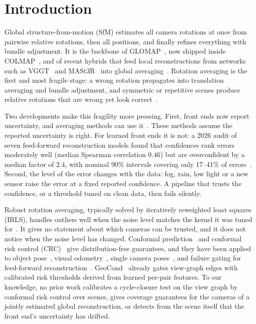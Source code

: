 \section{Introduction}\label{sec:intro}

Global structure-from-motion (SfM) estimates all camera rotations at once from pairwise relative rotations, then all positions, and finally refines everything with bundle adjustment. It is the backbone of GLOMAP~\cite{pan2024glomap}, now shipped inside COLMAP~\cite{schoenberger2016sfm}, and of recent hybrids that feed local reconstructions from networks such as VGGT~\cite{wang2025vggt} and MASt3R~\cite{leroy2024mast3r,duisterhof2025mast3rsfm} into global averaging~\cite{pan2026gluemap}. Rotation averaging is the first and most fragile stage: a wrong rotation propagates into translation averaging and bundle adjustment, and symmetric or repetitive scenes produce relative rotations that are wrong yet look correct~\cite{zach2010disambiguating,heinly2014correcting,cai2023doppelgangers}.

Two developments make this fragility more pressing. First, front ends now report uncertainty, and averaging methods can use it~\cite{zhang2023revisiting,olsson2025certifiably}. These methods assume the reported uncertainty is right. For learned front ends it is not: a 2026 audit of seven feed-forward reconstruction models found that confidences rank errors moderately well (median Spearman correlation $0.46$) but are overconfident by a median factor of $2.4$, with nominal 90\% intervals covering only 17--41\% of errors~\cite{deng2026audit}. Second, the level of the error changes with the data: fog, rain, low light or a new sensor raise the error at a fixed reported confidence. A pipeline that trusts the confidence, or a threshold tuned on clean data, then fails silently.

Robust rotation averaging, typically solved by iteratively reweighted least squares (IRLS), handles outliers well when the noise level matches the kernel it was tuned for~\cite{chatterjee2018robust,hartley2011l1,sidhartha2021weights}. It gives no statement about which cameras can be trusted, and it does not notice when the noise level has changed. Conformal prediction~\cite{vovk2005algorithmic,angelopoulos2023gentle} and conformal risk control (CRC)~\cite{angelopoulos2024crc} give distribution-free guarantees, and they have been applied to object pose~\cite{yang2023object}, visual odometry~\cite{stutts2023conformal}, single camera poses~\cite{pathak2026adaptive}, and failure gating for feed-forward reconstruction~\cite{ahmedt2026geocond}. GeoCond~\cite{ahmedt2026geocond} already gates view-graph edges with calibrated risk thresholds derived from learned per-pair features. To our knowledge, no prior work calibrates a cycle-closure test on the view graph by conformal risk control over scenes, gives coverage guarantees for the cameras of a jointly estimated global reconstruction, or detects from the scene itself that the front end's uncertainty has drifted.

